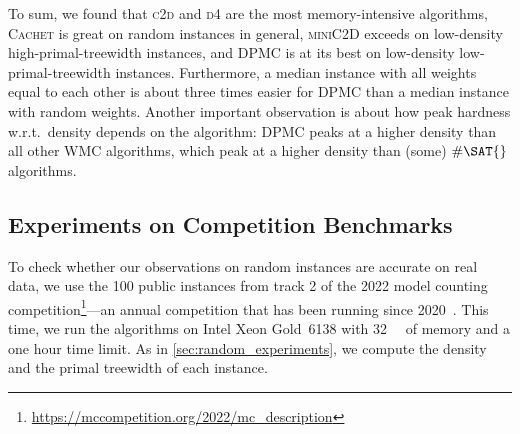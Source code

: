 \documentclass[runningheads]{llncs}
\begin{document}
To sum, we found that \textsc{c2d} and \textsc{d4} are the most memory-intensive
algorithms, \textsc{Cachet} is great on random instances in general,
\textsc{miniC2D} exceeds on low-density high-primal-treewidth instances, and
\textsc{DPMC} is at its best on low-density low-primal-treewidth instances.
Furthermore, a median instance with all weights equal to each other is about
three times easier for \textsc{DPMC} than a median instance with random weights.
Another important observation is about how peak hardness w.r.t.\ density depends
on the algorithm: \textsc{DPMC} peaks at a higher density than all other
\textsf{WMC} algorithms, which peak at a higher density than (some) $\#\SAT{}$
algorithms.

\subsection{Experiments on Competition
  Benchmarks}\label{sec:benchmark_experiments}

To check whether our observations on random instances are accurate on real data,
we use the 100 public instances from track 2 of the 2022 model counting
competition\footnote{\url{https://mccompetition.org/2022/mc\_description}}---an
annual competition that has been running since
2020~\cite{DBLP:journals/jea/FichteHH21}. This time, we run the algorithms on
Intel Xeon Gold~6138 with \SI{32}{\gibi\byte} of memory and a one hour time
limit. As in \cref{sec:random_experiments}, we compute the density and the
primal treewidth of each instance.
\end{document}
